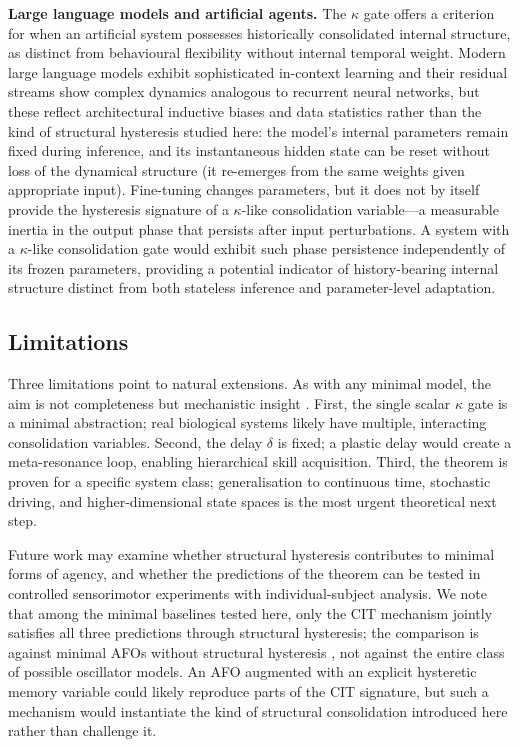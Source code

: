 \textbf{Large language models and artificial agents.} The $\kappa$ gate offers a criterion for when an artificial system possesses historically consolidated internal structure, as distinct from behavioural flexibility without internal temporal weight. Modern large language models exhibit sophisticated in-context learning \cite{chan2022data} and their residual streams show complex dynamics analogous to recurrent neural networks, but these reflect architectural inductive biases and data statistics rather than the kind of structural hysteresis studied here: the model's internal parameters remain fixed during inference, and its instantaneous hidden state can be reset without loss of the dynamical structure (it re-emerges from the same weights given appropriate input). Fine-tuning changes parameters, but it does not by itself provide the hysteresis signature of a $\kappa$-like consolidation variable—a measurable inertia in the output phase that persists after input perturbations. A system with a $\kappa$-like consolidation gate would exhibit such phase persistence independently of its frozen parameters, providing a potential indicator of history-bearing internal structure distinct from both stateless inference and parameter-level adaptation.

\subsection{Limitations}

Three limitations point to natural extensions. As with any minimal model, the aim is not completeness but mechanistic insight \cite{box1976science}. First, the single scalar $\kappa$ gate is a minimal abstraction; real biological systems likely have multiple, interacting consolidation variables. Second, the delay $\delta$ is fixed; a plastic delay would create a meta-resonance loop, enabling hierarchical skill acquisition. Third, the theorem is proven for a specific system class; generalisation to continuous time, stochastic driving, and higher-dimensional state spaces is the most urgent theoretical next step.

Future work may examine whether structural hysteresis contributes to minimal forms of agency, and whether the predictions of the theorem can be tested in controlled sensorimotor experiments with individual-subject analysis. We note that among the minimal baselines tested here, only the CIT mechanism jointly satisfies all three predictions through structural hysteresis; the comparison is against minimal AFOs without structural hysteresis \cite{righetti2009adaptive, ijspeert2008central}, not against the entire class of possible oscillator models. An AFO augmented with an explicit hysteretic memory variable could likely reproduce parts of the CIT signature, but such a mechanism would instantiate the kind of structural consolidation introduced here rather than challenge it.


